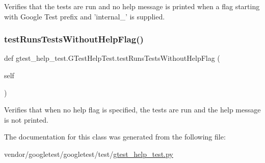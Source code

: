 \begin{DoxyVerb}Verifies that the tests are run and no help message is printed when
a flag starting with Google Test prefix and 'internal_' is supplied.\end{DoxyVerb}
 \mbox{\label{classgtest__help__test_1_1_g_test_help_test_ae7831f92e8e3763c07afb908915b3d20}} 
\subsubsection{\texorpdfstring{test\+Runs\+Tests\+Without\+Help\+Flag()}{testRunsTestsWithoutHelpFlag()}}
{\footnotesize\ttfamily def gtest\+\_\+help\+\_\+test.\+G\+Test\+Help\+Test.\+test\+Runs\+Tests\+Without\+Help\+Flag (\begin{DoxyParamCaption}\item[{}]{self }\end{DoxyParamCaption})}

\begin{DoxyVerb}Verifies that when no help flag is specified, the tests are run
and the help message is not printed.\end{DoxyVerb}
 

The documentation for this class was generated from the following file\+:\begin{DoxyCompactItemize}
\item 
vendor/googletest/googletest/test/\hyperlink{gtest__help__test_8py}{gtest\+\_\+help\+\_\+test.\+py}\end{DoxyCompactItemize}
